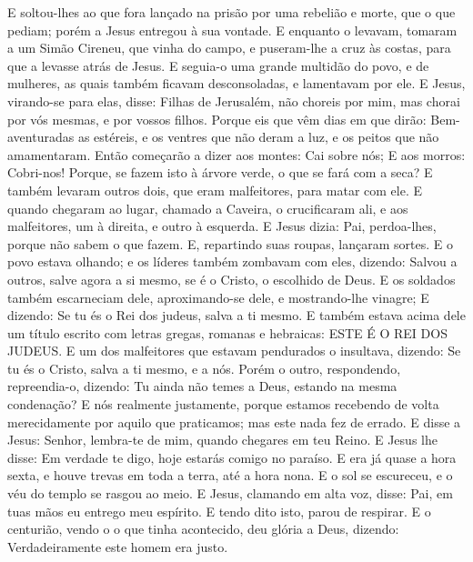 {  E soltou-lhes ao que fora lançado na prisão por uma rebelião e
{} morte, que
{} o que pediam; porém a Jesus
{} entregou à sua vontade.
  E enquanto o levavam, tomaram a um Simão Cireneu, que vinha do campo, e puseram-lhe a cruz às costas, para que a levasse atrás de Jesus.
  E seguia-o uma grande multidão do povo, e de mulheres, as quais também ficavam desconsoladas, e lamentavam por ele.
  E Jesus, virando-se para elas, disse: Filhas de Jerusalém, não choreis por mim, mas chorai por vós mesmas, e por vossos filhos.
  Porque eis que vêm dias em que dirão: Bem-aventuradas as estéreis, e os ventres que não deram a luz, e os peitos que não amamentaram.
  Então começarão a dizer aos montes: Cai sobre nós; E aos morros: Cobri-nos!
  Porque, se fazem isto à árvore verde, o que se fará com a
{} seca?
  E também levaram outros dois, que eram malfeitores, para matar com ele.
  E quando chegaram ao lugar, chamado a Caveira, o crucificaram ali, e aos malfeitores, um à direita, e outro à esquerda.
  E Jesus dizia: Pai, perdoa-lhes, porque não sabem o que fazem. E, repartindo suas roupas, lançaram sortes.
  E o povo estava olhando; e os líderes também zombavam com eles, dizendo: Salvou a outros, salve agora a si mesmo, se é o Cristo, o escolhido de Deus.
  E os soldados também escarneciam dele, aproximando-se dele, e mostrando-lhe vinagre;
  E dizendo: Se tu és o Rei dos judeus, salva a ti mesmo.
  E também estava acima dele um título escrito com letras gregas, romanas e hebraicas: ESTE É O REI DOS JUDEUS.
  E um dos malfeitores que estavam pendurados o insultava, dizendo: Se tu és o Cristo, salva a ti mesmo, e a nós.
  Porém o outro, respondendo, repreendia-o, dizendo: Tu ainda não temes a Deus,
{} estando na mesma condenação?
  E nós realmente
{} justamente, porque estamos recebendo de volta merecidamente por aquilo que praticamos; mas este nada fez de errado.
  E disse a Jesus: Senhor, lembra-te de mim, quando chegares em teu Reino.
  E Jesus lhe disse: Em verdade te digo, hoje estarás comigo no paraíso.
  E era já quase a hora sexta, e houve trevas em toda a terra, até a hora nona.
  E o sol se escureceu, e o véu do templo se rasgou ao meio.
  E Jesus, clamando em alta voz, disse: Pai, em tuas mãos eu entrego meu espírito. E tendo dito isto, parou de respirar.
  E o centurião, vendo o o que tinha acontecido, deu glória a Deus, dizendo: Verdadeiramente este homem era justo.
}
